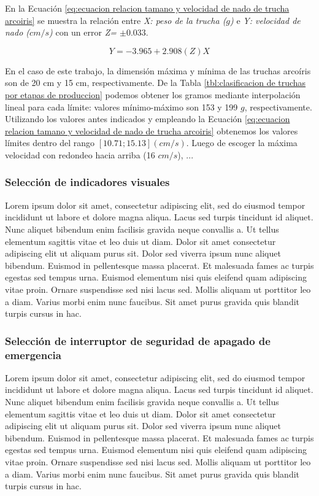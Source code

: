 En la Ecuación \ref{eq:ecuacion relacion tamano y velocidad de nado de trucha arcoiris} se muestra la relación entre \textit{X: peso de la trucha ($g$)} e \textit{Y: velocidad de nado ($cm/s$)} con un error \textit{Z= $\pm 0.033$}. 

\begin{equation} \label{eq:ecuacion relacion tamano y velocidad de nado de trucha arcoiris}
	Y=-3.965+2.908(Z)X
\end{equation}

En el caso de este trabajo, la dimensión máxima y mínima de las truchas arcoíris son de 20 cm y 15 cm, respectivamente. De la Tabla \ref{tbl:clasificacion de truchas por etapas de produccion} podemos obtener los gramos mediante interpolación lineal para cada límite: valores mínimo-máximo son 153 y 199 \textit{$g$}, respectivamente. Utilizando los valores antes indicados y empleando la Ecuación \ref{eq:ecuacion relacion tamano y velocidad de nado de trucha arcoiris} obtenemos los valores límites dentro del rango $[10.71; 15.13] (cm/s)$. Luego de escoger la máxima velocidad con redondeo hacia arriba (16 $cm/s$), ...


\subsubsection{Selección de indicadores visuales} %

Lorem ipsum dolor sit amet, consectetur adipiscing elit, sed do eiusmod tempor incididunt ut labore et dolore magna aliqua. Lacus sed turpis tincidunt id aliquet. Nunc aliquet bibendum enim facilisis gravida neque convallis a. Ut tellus elementum sagittis vitae et leo duis ut diam. Dolor sit amet consectetur adipiscing elit ut aliquam purus sit. Dolor sed viverra ipsum nunc aliquet bibendum. Euismod in pellentesque massa placerat. Et malesuada fames ac turpis egestas sed tempus urna. Euismod elementum nisi quis eleifend quam adipiscing vitae proin. Ornare suspendisse sed nisi lacus sed. Mollis aliquam ut porttitor leo a diam. Varius morbi enim nunc faucibus. Sit amet purus gravida quis blandit turpis cursus in hac.

\subsubsection{Selección de interruptor de seguridad de apagado de emergencia}

Lorem ipsum dolor sit amet, consectetur adipiscing elit, sed do eiusmod tempor incididunt ut labore et dolore magna aliqua. Lacus sed turpis tincidunt id aliquet. Nunc aliquet bibendum enim facilisis gravida neque convallis a. Ut tellus elementum sagittis vitae et leo duis ut diam. Dolor sit amet consectetur adipiscing elit ut aliquam purus sit. Dolor sed viverra ipsum nunc aliquet bibendum. Euismod in pellentesque massa placerat. Et malesuada fames ac turpis egestas sed tempus urna. Euismod elementum nisi quis eleifend quam adipiscing vitae proin. Ornare suspendisse sed nisi lacus sed. Mollis aliquam ut porttitor leo a diam. Varius morbi enim nunc faucibus. Sit amet purus gravida quis blandit turpis cursus in hac.

